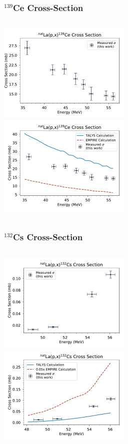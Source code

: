 \documentclass[12pt,xcolor=dvipsnames]{beamer}
\begin{document}
\begin{frame}
\frametitle{$^{139}$Ce Cross-Section}
\begin{columns}[c]
\column{2.5in}
\includegraphics[width=2.5in]{cross_sections/139CE_only}
\\
\column{2.5in}
\includegraphics[width=2.5in]{cross_sections/139CE}
\\
\end{columns}
\end{frame}

\begin{frame}
\frametitle{$^{132}$Cs Cross-Section}
\begin{columns}[c]
\column{2.5in}
\includegraphics[width=2.5in]{cross_sections/132CS_only}
\\
\column{2.5in}
\includegraphics[width=2.5in]{cross_sections/132CS}
\\
\end{columns}
\end{frame}
\end{document}
